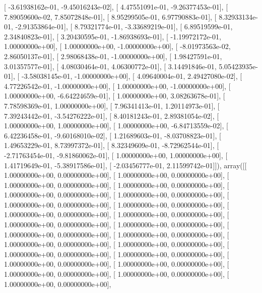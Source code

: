 \documentclass{article}
\begin{document}
       [ -3.61938162e-01,  -9.45016243e-02],
       [  4.47551091e-01,  -9.26377453e-01],
       [  7.89059600e-02,   7.85072848e-01],
       [  8.95299505e-01,   6.97790883e-01],
       [  8.32933134e-01,  -2.91353864e-01],
       [  8.79321774e-01,  -3.33689219e-01],
       [  6.89519599e-01,   2.34840823e-01],
       [  3.20430595e-01,  -1.86938693e-01],
       [ -1.19972172e-01,   1.00000000e+00],
       [  1.00000000e+00,  -1.00000000e+00],
       [ -8.01973563e-02,   2.86050137e-01],
       [  2.98068438e-01,  -1.00000000e+00],
       [  1.98427591e-01,   3.01357577e-01],
       [  4.08030464e-01,   4.06300772e-01],
       [  3.14491846e-01,   5.05423935e-01],
       [ -3.58038145e-01,  -1.00000000e+00],
       [  4.09640004e-01,   2.49427080e-02],
       [  4.77226542e-01,  -1.00000000e+00],
       [  1.00000000e+00,  -1.00000000e+00],
       [  1.00000000e+00,  -6.64224659e-01],
       [  1.00000000e+00,   3.08263678e-01],
       [  7.78598369e-01,   1.00000000e+00],
       [  7.96341413e-01,   1.20114973e-01],
       [  7.39243442e-01,  -3.54276222e-01],
       [  8.40181243e-01,   2.89381054e-02],
       [  1.00000000e+00,   1.00000000e+00],
       [  1.00000000e+00,  -6.84713559e-02],
       [  6.42236458e-01,  -9.60168010e-02],
       [  1.21689603e-01,  -8.03708823e-01],
       [  1.49653229e-01,   8.73997372e-01],
       [  8.32349609e-01,  -8.72962544e-01],
       [ -2.71763454e-01,  -9.81860062e-01],
       [  1.00000000e+00,   1.00000000e+00],
       [  1.41719649e-01,  -5.38917586e-01],
       [ -2.03456777e-01,   2.11599742e-01]]), array([[  1.00000000e+00,   0.00000000e+00],
       [  1.00000000e+00,   0.00000000e+00],
       [  1.00000000e+00,   0.00000000e+00],
       [  1.00000000e+00,   0.00000000e+00],
       [  1.00000000e+00,   0.00000000e+00],
       [  1.00000000e+00,   0.00000000e+00],
       [  1.00000000e+00,   0.00000000e+00],
       [  1.00000000e+00,   0.00000000e+00],
       [  1.00000000e+00,   0.00000000e+00],
       [  1.00000000e+00,   0.00000000e+00],
       [  1.00000000e+00,   0.00000000e+00],
       [  1.00000000e+00,   0.00000000e+00],
       [  1.00000000e+00,   0.00000000e+00],
       [  1.00000000e+00,   0.00000000e+00],
       [  1.00000000e+00,   0.00000000e+00],
       [  1.00000000e+00,   0.00000000e+00],
       [  1.00000000e+00,   0.00000000e+00],
       [  1.00000000e+00,   0.00000000e+00],
       [  1.00000000e+00,   0.00000000e+00],
       [  1.00000000e+00,   0.00000000e+00],
       [  1.00000000e+00,   0.00000000e+00],
       [  1.00000000e+00,   0.00000000e+00],
       [  1.00000000e+00,   0.00000000e+00],
\end{document}

